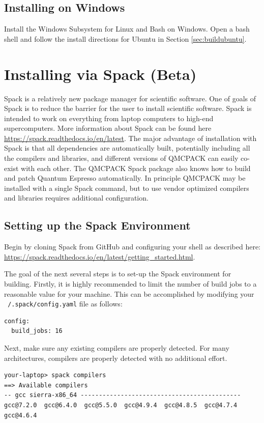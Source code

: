 \subsection{Installing on Windows}
Install the Windows Subsystem for Linux and Bash on Windows.
Open a bash shell and follow the install directions for Ubuntu in Section \ref{sec:buildubuntu}.

\section{Installing via Spack (Beta)}
Spack is a relatively new package manager for scientific software.
One of goals of Spack is to reduce the barrier for the user to install scientific
software. Spack is intended to work on everything from laptop
computers to high-end supercomputers. More information about Spack can
be found here \url{https://spack.readthedocs.io/en/latest}. The major
advantage of installation with Spack is that all dependencies are
automatically built, potentially including all the compilers and libraries, and
different versions of QMCPACK can easily co-exist with each other.
The QMCPACK Spack package also knows how to build
and patch Quantum Espresso automatically. In principle QMCPACK may be installed with
a single Spack command, but to use vendor optimized compilers and libraries requires
additional configuration.

\subsection{Setting up the Spack Environment}
Begin by cloning Spack from GitHub and configuring your shell as described
here:
\url{https://spack.readthedocs.io/en/latest/getting_started.html}.

The goal of the next several steps is to set-up the Spack environment
for building. Firstly, it is highly recommended to limit the number of build jobs to
a reasonable value for your machine. This can be
accomplished by modifying your \texttt{~/.spack/config.yaml} file as follows:
\verbatimfont{\footnotesize}
\begin{verbatim}
config:
  build_jobs: 16
\end{verbatim}

Next, make sure any existing compilers are properly detected. For many
architectures, compilers are properly detected with no additional
effort.
\verbatimfont{\footnotesize}
\begin{verbatim}
your-laptop> spack compilers
==> Available compilers
-- gcc sierra-x86_64 --------------------------------------------
gcc@7.2.0  gcc@6.4.0  gcc@5.5.0  gcc@4.9.4  gcc@4.8.5  gcc@4.7.4  gcc@4.6.4
\end{verbatim}


